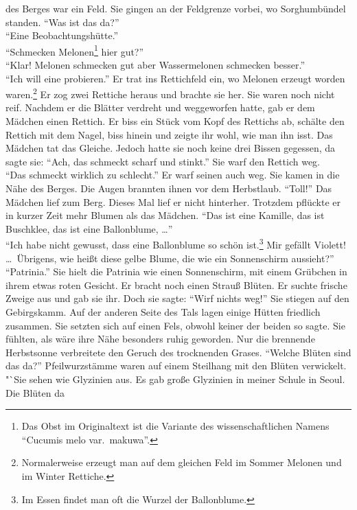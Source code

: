 \documentclass[prd,12pt,tightenlines,notitlepage,nofootinbib]{revtex4-1}
\begin{document}
des Berges war ein Feld.  Sie gingen an der Feldgrenze vorbei, wo
Sorghumbündel standen.  "`Was ist das da?"'\\
"`Eine Beobachtungshütte."'\\
"`Schmecken Melonen\footnote{
  Das Obst im Originaltext ist die Variante des wissenschaftlichen Namens
  "`Cucumis melo var.\ makuwa"'.}
hier gut?"'\\
"`Klar!  Melonen schmecken gut aber Wassermelonen schmecken besser."'\\
"`Ich will eine probieren."'  Er
trat ins Rettichfeld ein, wo Melonen erzeugt worden waren.\footnote{
Normalerweise erzeugt man auf dem gleichen Feld
im Sommer Melonen und im Winter Rettiche.}
Er zog
zwei Rettiche heraus und brachte sie her.  Sie waren noch nicht reif.
Nachdem er die Blätter verdreht und weggeworfen hatte, gab er dem Mädchen einen
Rettich.  Er biss ein Stück vom Kopf des Rettichs ab, schälte den
Rettich mit dem Nagel, biss hinein und zeigte ihr wohl, wie man ihn
isst.  Das Mädchen tat das Gleiche.  Jedoch hatte sie noch keine drei
Bissen gegessen, da sagte sie: "`Ach, das schmeckt scharf und stinkt."'  Sie warf den
Rettich weg.
\\ "`Das schmeckt wirklich zu schlecht."'  Er warf seinen auch
weg.  Sie kamen in die Nähe des Berges.  Die Augen brannten ihnen vor dem Herbstlaub.
"`Toll!"'  Das Mädchen lief zum Berg.  Dieses Mal lief er nicht hinterher.
Trotzdem pflückte er in kurzer Zeit mehr Blumen als das Mädchen.
"`Das ist eine Kamille, das ist Buschklee, das ist eine Ballonblume, \ldots"'
\\ "`Ich habe nicht gewusst, dass eine Ballonblume so schön ist.\footnote{
Im Essen findet man oft die Wurzel der Ballonblume.}
Mir gefällt
Violett!  \ldots\  Übrigens, wie heißt diese gelbe Blume, die wie ein
Sonnenschirm aussieht?"'\\
"`Patrinia."'  Sie hielt die Patrinia wie einen
Sonnenschirm, mit einem Grübchen in ihrem etwas roten Gesicht.  Er
bracht noch einen Strauß Blüten.  Er suchte frische Zweige aus und
gab sie ihr.  Doch sie sagte: "`Wirf nichts weg!"'  Sie stiegen auf den
Gebirgskamm.  Auf der anderen Seite des Tals lagen einige Hütten
friedlich zusammen.  Sie setzten sich auf einen Fels, obwohl keiner der beiden
so sagte.  Sie fühlten, als wäre ihre Nähe besonders ruhig geworden.  Nur die
brennende Herbstsonne verbreitete den Geruch des trocknenden Grases.
"`Welche Blüten sind das da?"'  Pfeilwurzstämme waren auf einem
Steilhang mit den Blüten verwickelt.  "`Sie sehen wie Glyzinien aus.
Es gab große Glyzinien in meiner Schule in Seoul.  Die Blüten da
\end{document}
